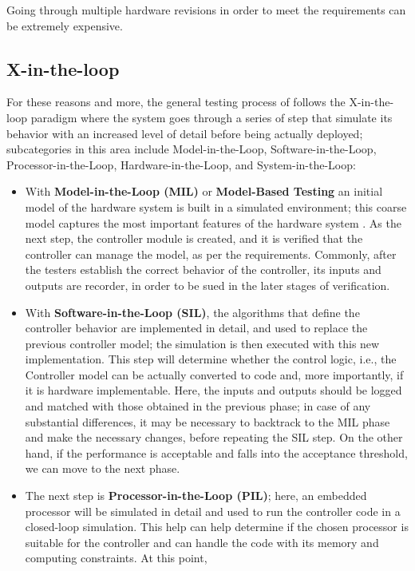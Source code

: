 Going through multiple hardware revisions in order to meet the requirements can be extremely expensive.

\subsection{X-in-the-loop}
For these reasons and more, the general testing process of \ess follows the X-in-the-loop paradigm \cite{DBLP:journals/software/GarousiFKY18} where the system goes through a series of step that simulate its behavior with an increased level of detail before being actually deployed; subcategories in this area include Model-in-the-Loop, Software-in-the-Loop, Processor-in-the-Loop, Hardware-in-the-Loop, and System-in-the-Loop:
\begin{itemize}
    \item With \textbf{Model-in-the-Loop (MIL)} or \textbf{Model-Based Testing} an initial model of the hardware system is built in a simulated environment; this coarse model captures the most important features of the hardware system \cite{XLoop}. As the next step, the controller module is created, and it is verified that the controller can manage the model, as per the requirements. Commonly, after the testers establish the correct behavior of the controller, its inputs and outputs are recorder, in order to be sued in the later stages of verification.
    \item With \textbf{Software-in-the-Loop (SIL)}, the algorithms that define the controller behavior are implemented in detail, and used to replace the previous controller model; the simulation is then executed with this new implementation. This step will determine whether the control logic, i.e., the Controller model can be actually converted to code and, more importantly, if it is hardware implementable. Here, the inputs and outputs should be logged and matched with those obtained in the previous phase; in case of any substantial differences, it may be necessary to backtrack to the MIL phase and make the necessary changes, before repeating the SIL step. On the other hand, if the performance is acceptable and falls into the acceptance threshold, we can move to the next phase.
    \item The next step is \textbf{Processor-in-the-Loop (PIL)}; here, an embedded processor will be simulated in detail and used to run the controller code in a closed-loop simulation. This help can help determine if the chosen processor is suitable for the controller and can handle the code with its memory and computing constraints. At this point, 

\end{itemize}
